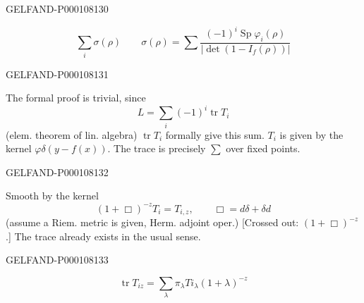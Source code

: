\begin{GelfandAdjacentEvidence}{GELFAND-P000108}{130}

\begin{equation*}\sum_i\sigma(\rho)\qquad\sigma(\rho)=\sum\frac{(-1)^i\operatorname{Sp}\varphi_i(\rho)}{|\operatorname{det}(1-I_f(\rho))|}\end{equation*}
\end{GelfandAdjacentEvidence}
\begin{GelfandAdjacentEvidence}{GELFAND-P000108}{131}

The formal proof is trivial, since
\begin{equation*}L=\sum_i(-1)^i\operatorname{tr}T_i\end{equation*}
(elem. theorem of lin. algebra)
$\operatorname{tr}T_i$ formally give this sum.
$T_i$ is given by the kernel $\varphi\delta(y-f(x))$. The trace is precisely $\sum$ over fixed points.
\end{GelfandAdjacentEvidence}
\begin{GelfandAdjacentEvidence}{GELFAND-P000108}{132}

Smooth by the kernel
\begin{equation*}(1+\Box)^{-z}T_i=T_{i,z},\qquad\Box=d\delta+\delta d\end{equation*}
(assume a Riem. metric is given, Herm. adjoint oper.)
[Crossed out: $(1+\Box)^{-z}$.]
The trace already exists in the usual sense.
\end{GelfandAdjacentEvidence}
\begin{GelfandAdjacentEvidence}{GELFAND-P000108}{133}

\begin{equation*}\operatorname{tr}T_{iz}=\sum_\lambda\pi_\lambda T i_\lambda(1+\lambda)^{-z}\end{equation*}
\end{GelfandAdjacentEvidence}
